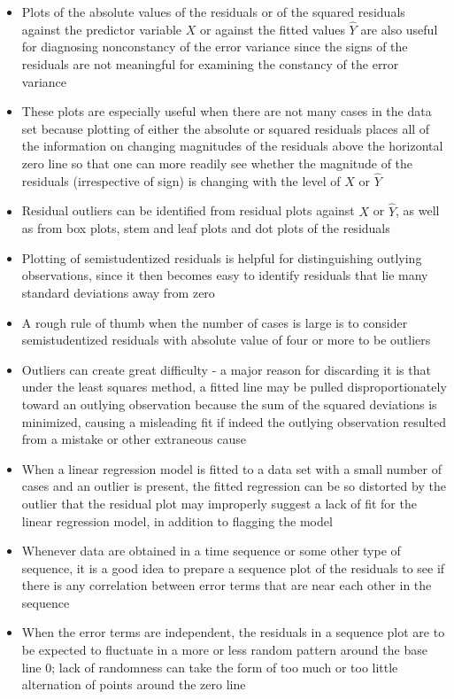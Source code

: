 \begin{itemize}
\item Plots of the absolute values of the residuals or of the squared residuals against the predictor variable $X$ or against the fitted values $\hat{Y}$ are also useful for diagnosing nonconstancy of the error variance since the signs of the residuals are not meaningful for examining the constancy of the error variance
\item These plots are especially useful when there are not many cases in the data set because plotting of either the absolute or squared residuals places all of the information on changing magnitudes of the residuals above the horizontal zero line so that one can more readily see whether the magnitude of the residuals (irrespective of sign) is changing with the level of $X$ or $\hat{Y}$
\item Residual outliers can be identified from residual plots against $X$ or $\hat{Y}$, as well as from box plots, stem and leaf plots and dot plots of the residuals 
\item Plotting of semistudentized residuals is helpful for distinguishing outlying observations, since it then becomes easy to identify residuals that lie many standard deviations away from zero
\item A rough rule of thumb when the number of cases is large is to consider semistudentized residuals with absolute value of four or more to be outliers
\item Outliers can create great difficulty - a major reason for discarding it is that under the least squares method, a fitted line may be pulled disproportionately toward an outlying observation because the sum of the squared deviations is minimized, causing a misleading fit if indeed the outlying observation resulted from a mistake or other extraneous cause 
\item When a linear regression model is fitted to a data set with a small number of cases and an outlier is present, the fitted regression can be so distorted by the outlier that the residual plot may improperly suggest a lack of fit for the linear regression model, in addition to flagging the model 
\item Whenever data are obtained in a time sequence or some other type of sequence, it is a good idea to prepare a sequence plot of the residuals to see if there is any correlation between error terms that are near each other in the sequence 
\item When the error terms are independent, the residuals in a sequence plot are to be expected to fluctuate in a more or less random pattern around the base line $0$; lack of randomness can take the form of too much or too little alternation of points around the zero line 

\end{itemize}
